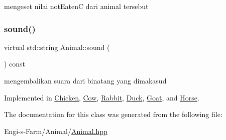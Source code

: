 mengeset nilai not\+EatenC dari animal tersebut \mbox{\label{class_animal_aca8216576b21b87f761a34686a4968a8}} 
\subsubsection{\texorpdfstring{sound()}{sound()}}
{\footnotesize\ttfamily virtual std\+::string Animal\+::sound (\begin{DoxyParamCaption}{ }\end{DoxyParamCaption}) const\hspace{0.3cm}{\ttfamily [pure virtual]}}

mengembalikan suara dari binatang yang dimakasud 

Implemented in \mbox{\hyperlink{class_chicken_a2ea0957d2902deeb06bb88e2a663b525}{Chicken}}, \mbox{\hyperlink{class_cow_a31d7c184a971dccda54fdf098c5f0460}{Cow}}, \mbox{\hyperlink{class_rabbit_aa60f2e9bf2ca051d092c79c161b988b6}{Rabbit}}, \mbox{\hyperlink{class_duck_a26799f737ee32fd2b7cd871ec1a2727f}{Duck}}, \mbox{\hyperlink{class_goat_adfb044fddaba239be655d3f5fa9feb5e}{Goat}}, and \mbox{\hyperlink{class_horse_ae1a6e7e8d7e887b875dcfdad9b0fb3b5}{Horse}}.



The documentation for this class was generated from the following file\+:\begin{DoxyCompactItemize}
\item 
Engi-\/s-\/\+Farm/\+Animal/\mbox{\hyperlink{_animal_8hpp}{Animal.\+hpp}}\end{DoxyCompactItemize}

